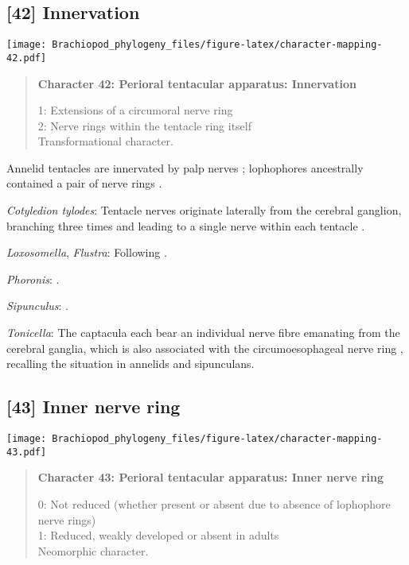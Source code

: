 \documentclass[openany]{book}
\theoremstyle{definition}
\theoremstyle{definition}
\theoremstyle{definition}
\theoremstyle{remark}
\begin{document}
\subsection*{{[}42{]} Innervation}\label{innervation}

\texttt{[image: Brachiopod\_phylogeny\_files/figure-latex/character-mapping-42.pdf]}

\begin{quote}
\textbf{Character 42: Perioral tentacular apparatus: Innervation}

1: Extensions of a circumoral nerve ring\\
2: Nerve rings within the tentacle ring itself\\
Transformational character.
\end{quote}

Annelid tentacles are innervated by palp nerves \citep{Orrhage2005};
lophophores ancestrally contained a pair of nerve rings
\citep{Temereva2017Innervationof}.

\hypertarget{Cotyledion_tylodes-coding-42}{}
\emph{Cotyledion tylodes}: Tentacle nerves originate laterally from the
cerebral ganglion, branching three times and leading to a single nerve
within each tentacle \citep{Fuchs2006}.

\hypertarget{Flustra-coding-42}{}
\emph{Loxosomella}, \emph{Flustra}: Following
\citet{Temereva2017Innervationof}.

\hypertarget{Phoronis-coding-42}{}
\emph{Phoronis}: \citet{Rice1993}.

\hypertarget{Sipunculus-coding-42}{}
\emph{Sipunculus}: \citet{Orrhage2005}.

\hypertarget{Tonicella-coding-42}{}
\emph{Tonicella}: The captacula each bear an individual nerve fibre
emanating from the cerebral ganglia, which is also associated with the
circumoesophageal nerve ring \citep{SumnerRooney2015}, recalling the
situation in annelids and sipunculans.

\subsection*{{[}43{]} Inner nerve ring}\label{inner-nerve-ring}

\texttt{[image: Brachiopod\_phylogeny\_files/figure-latex/character-mapping-43.pdf]}

\begin{quote}
\textbf{Character 43: Perioral tentacular apparatus: Inner nerve ring}

0: Not reduced (whether present or absent due to absence of lophophore
nerve rings)\\
1: Reduced, weakly developed or absent in adults\\
Neomorphic character.
\end{quote}
\end{document}
